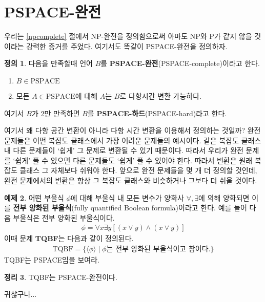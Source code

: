 \documentclass[b5paper, 11pt]{book}
\theoremstyle{definition}
\newtheorem{defn}{정의}[chapter]
\newtheorem{thm}[defn]{정리}
\newtheorem{ex}[defn]{예제}
\newenvironment{pf*}{\pushQED{\qed}\pf}
{\popQED\endpf}
\begin{document}
\section{PSPACE-완전}
우리는 \ref{npcomplete} 절에서 NP-완전을 정의함으로써 아마도 NP와 P가 같지 않을 것이라는 강력한 증거를 주었다. 여기서도 똑같이 PSPACE-완전을 정의하자.
\begin{defn}
    다음을 만족할때 언어 $B$를 \textbf{PSPACE-완전}(PSPACE-complete)이라고 한다.
    \begin{enumerate}
        \item $B \in \text{PSPACE}$
        \item 모든 $A \in \text{PSPACE} $에 대해 $A$는 $B$로 다항시간 변환 가능하다.  
    \end{enumerate}
    여기서 $B$가 2만 만족하면 $B$를 \textbf{PSPACE-하드}(PSPACE-hard)라고 한다.
\end{defn}
여기서 왜 다항 공간 변환이 아니라 다항 시간 변환을 이용해서 정의하는 것일까? 완전 문제들은 어떤 복잡도 클래스에서 가장 어려운 문제들의 예시이다. 같은 복잡도 클래스 내 다른 문제들이 `쉽게' 그 문제로 변환될 수 있기 때문이다. 따라서 우리가 완전 문제를 `쉽게' 풀 수 있으면 다른 문제들도 `쉽게' 풀 수 있어야 한다. 따라서 변환은 원래 복잡도 클래스 그 자체보다 쉬워야 한다. 앞으로 완전 문제들을 몇 개 더 정의할 것인데, 완전 문제에서의 변환은 항상 그 복잡도 클래스와 비슷하거나 그보다 더 쉬울 것이다. 
\begin{ex}
    어떤 부울식 $\phi$에 대해 부울식 내 모든 변수가 양화사 $\forall, \exists$에 의해 양화되면 이를 \textbf{전부 양화된 부울식}(fully quantified Boolean formula)이라고 한다. 예를 들어 다음 부울식은 전부 양화된 부울식이다.
    \begin{align*}
        \phi = \forall x \exists y [(x \vee y) \wedge (\overline{x} \vee \overline{y})]
    \end{align*}
    이때 문제 \textbf{TQBF}는 다음과 같이 정의된다.
    \begin{align*}
        \text{TQBF} = \{\langle \phi \rangle \;\vert\; \phi \text{는 전부 양화된 부울식이고 참이다.} \}
    \end{align*}
    TQBF는 PSPACE임을 보여라.
\end{ex}
\begin{thm}
    TQBF는 PSPACE-완전이다.
\end{thm}
\begin{pf*}
    귀찮구나...
\end{pf*}
\end{document}
